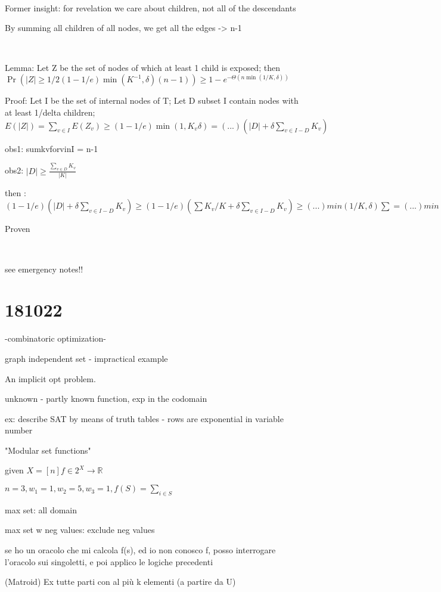 \documentclass{report}
\begin{document}
	
	\
	
	Former insight: for revelation we care about children, not all of the descendants
	
	By summing all children of all nodes, we get all the edges -> n-1
	
	\
	
	Lemma: Let Z be the set of nodes of which at least 1 child is exposed; then $\Pr(|Z| \geq 1/2(1-1/e)\min(K^{-1}, \delta)(n-1))\geq 1-e^{-\Theta(n\min(1/K, \delta))}$
	
	Proof: Let I be the set of internal nodes of T; Let D subset I contain nodes with at least 1/delta children; $E(|Z|) = \sum_{v \in I}E(Z_v) \geq (1 - 1/e)\min(1, K_v\delta) = (...)(|D| + \delta\sum_{v \in I-D}K_v)$

	obs1: sumkvforvinI = n-1
	
	obs2: $|D| \geq \frac{\sum_{v \in D}K_v}{|K|}$
	
	then : $(1 - 1/e)(|D| + \delta\sum_{v \in I-D}K_v) \geq (1 - 1/e)(\sum K_v/K + \delta\sum_{v \in I-D}K_v) \geq (...)min(1/K, \delta)\sum = (...)min(...)(n-1)$
	
	Proven
	
	\
	
	see emergency notes!!
	
	\section{181022}
	
	-combinatoric optimization-
	
	graph independent set - impractical example
	
	An implicit opt problem.
	
	unknown - partly known function, exp in the codomain
	
	ex: describe SAT by means of truth tables - rows are exponential in variable number
	
	"Modular set functions"
	
	given $X=[n] f \in 2^X \to \mathbb{R}$
	
	$n=3, w_1 = 1, w_2 = 5, w_3 = 1, f(S)=\sum_{i \in S}$
	
	max  set: all domain
	
	max set w neg values: exclude neg values
	
	se ho un oracolo che mi calcola f(s), ed io non conosco f, posso interrogare l'oracolo sui singoletti, e poi applico le logiche precedenti
	
	(Matroid) Ex tutte parti con al più k elementi (a partire da U)
	
\end{document}
